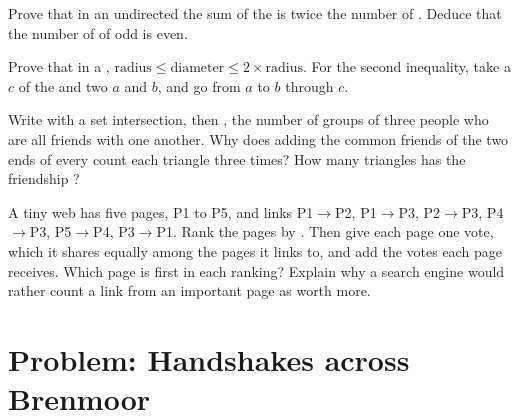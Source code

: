 \begin{exercise}[$\star\star\star$]\label{exo:g10:graphs-first-look:12}
Prove that in an undirected  the sum of the  is twice the number of . Deduce that the number of
 of odd  is even.
\end{exercise}

\begin{exercise}[$\star\star\star$]\label{exo:g10:graphs-first-look:13}
Prove that in a , $\text{radius} \le \text{diameter} \le 2 \times \text{radius}$. For the second
inequality, take a  $c$ of the  and two  $a$ and $b$, and go from $a$ to $b$ through $c$.
\end{exercise}

\begin{exercise}[$\star\star\star$]\label{exo:g10:graphs-first-look:14}
Write  with a set intersection, then , the number of groups of three
people who are all friends with one another. Why does adding the common friends of the two ends of every  count
each triangle three times? How many triangles has the friendship ?
\end{exercise}

\begin{exercise}[$\star\star\star$]\label{exo:g10:graphs-first-look:15}
A tiny web has five pages, P1 to P5, and links P1$\to$P2, P1$\to$P3, P2$\to$P3, P4$\to$P3, P5$\to$P4, P3$\to$P1.
Rank the pages by . Then give each page one vote, which it shares equally among the pages it links to, and
add the votes each page receives. Which page is first in each ranking? Explain why a search engine would rather
count a link from an important page as worth more.
\end{exercise}

\section{Problem: Handshakes across Brenmoor}\label{sec:g10:graphs-first-look:problem}

